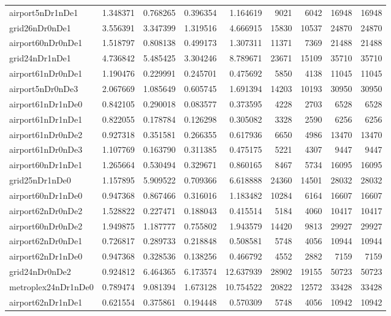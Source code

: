 \begin{longtable}{|l|r|r|r|r|r|r|r|r|}
airport5nDr1nDe1 & 1.348371 & 0.768265 & 0.396354 & 1.164619 & 9021 & 6042 & 16948 & 16948 \\
grid26nDr0nDe1 & 3.556391 & 3.347399 & 1.319516 & 4.666915 & 15830 & 10537 & 24870 & 24870 \\
airport60nDr0nDe1 & 1.518797 & 0.808138 & 0.499173 & 1.307311 & 11371 & 7369 & 21488 & 21488 \\
grid24nDr1nDe1 & 4.736842 & 5.485425 & 3.304246 & 8.789671 & 23671 & 15109 & 35710 & 35710 \\
airport61nDr0nDe1 & 1.190476 & 0.229991 & 0.245701 & 0.475692 & 5850 & 4138 & 11045 & 11045 \\
airport5nDr0nDe3 & 2.067669 & 1.085649 & 0.605745 & 1.691394 & 14203 & 10193 & 30950 & 30950 \\
airport61nDr1nDe0 & 0.842105 & 0.290018 & 0.083577 & 0.373595 & 4228 & 2703 & 6528 & 6528 \\
airport61nDr1nDe1 & 0.822055 & 0.178784 & 0.126298 & 0.305082 & 3328 & 2590 & 6256 & 6256 \\
airport61nDr0nDe2 & 0.927318 & 0.351581 & 0.266355 & 0.617936 & 6650 & 4986 & 13470 & 13470 \\
airport61nDr0nDe3 & 1.107769 & 0.163790 & 0.311385 & 0.475175 & 5221 & 4307 & 9447 & 9447 \\
airport60nDr1nDe1 & 1.265664 & 0.530494 & 0.329671 & 0.860165 & 8467 & 5734 & 16095 & 16095 \\
grid25nDr1nDe0 & 1.157895 & 5.909522 & 0.709366 & 6.618888 & 24360 & 14501 & 28032 & 28032 \\
airport60nDr1nDe0 & 0.947368 & 0.867466 & 0.316016 & 1.183482 & 10284 & 6164 & 16607 & 16607 \\
airport62nDr0nDe2 & 1.528822 & 0.227471 & 0.188043 & 0.415514 & 5184 & 4060 & 10417 & 10417 \\
airport60nDr0nDe2 & 1.949875 & 1.187777 & 0.755802 & 1.943579 & 14420 & 9813 & 29927 & 29927 \\
airport62nDr0nDe1 & 0.726817 & 0.289733 & 0.218848 & 0.508581 & 5748 & 4056 & 10944 & 10944 \\
airport62nDr1nDe0 & 0.947368 & 0.328536 & 0.138256 & 0.466792 & 4552 & 2882 & 7159 & 7159 \\
grid24nDr0nDe2 & 0.924812 & 6.464365 & 6.173574 & 12.637939 & 28902 & 19155 & 50723 & 50723 \\
metroplex24nDr1nDe0 & 0.789474 & 9.081394 & 1.673128 & 10.754522 & 20822 & 12572 & 33428 & 33428 \\
airport62nDr1nDe1 & 0.621554 & 0.375861 & 0.194448 & 0.570309 & 5748 & 4056 & 10942 & 10942 \\

\end{longtable}
